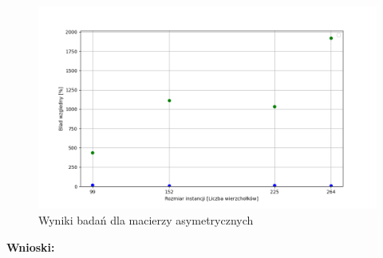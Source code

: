 \documentclass{article}
\begin{document}
        \begin{figure}[ht]
          \centering
          \includegraphics[width=\textwidth]{src/plots/symTsStartVal.png}
          \caption{Wyniki badań dla macierzy asymetrycznych}
          \label{fig:asymStartVal}
        \end{figure}
        \FloatBarrier
        \textbf{Wnioski: } 
\end{document}
